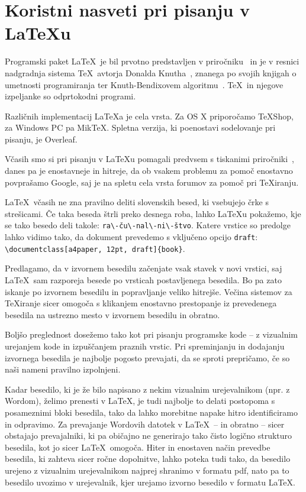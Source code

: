 \documentclass[a4paper,12pt,openright]{book}
\begin{document}
\chapter{Koristni nasveti pri pisanju v \LaTeX{u}}
\label{latex}

Programski paket \LaTeX\ je bil prvotno predstavljen v priročniku~\cite{lamport} in je v resnici nadgradnja sistema \TeX\ avtorja Donalda Knutha~\cite{knuth}, 
znanega po svojih knjigah o umetnosti programiranja
ter Knuth-Bendixovem algoritmu~\cite{knuth1983simple}.
\TeX\ in njegove izpeljanke so odprtokodni programi.

Različnih implementacij \LaTeX{}a je cela vrsta.
Za OS X priporočamo TeXShop, za Windows PC pa MikTeX.
Spletna verzija, ki poenostavi sodelovanje pri pisanju, je Overleaf.

Včasih smo si pri pisanju v \LaTeX{}u  pomagali predvsem s tiskanimi pri\-ro\-čni\-ki~\cite{lamport}, danes pa je enostavneje in hitreje, da ob vsakem problemu za pomoč enostavno povprašamo Google, 
saj je na spletu cela vrsta forumov za pomoč pri \TeX iranju.

\LaTeX\ včasih ne zna pravilno deliti slovenskih besed, ki vsebujejo črke s streši\-ca\-mi. 
Če taka beseda štrli preko desnega roba,  lahko \LaTeX{}u pokažemo, kje se tako besedo deli takole: \verb=ra\-ču\-nal\-ni\-štvo=.
Katere vrstice so predolge lahko vidimo tako, da dokument prevedemo s vključeno opcijo \texttt{draft}: \verb=\documentclass[a4paper, 12pt, draft]{book}=.

Predlagamo, da v izvornem besedilu začenjate vsak stavek v novi vrstici, saj \LaTeX\ sam razporeja besede po vrsticah postavljenega besedila. 
Bo pa zato iskanje po izvornem besedilu in popravljanje veliko hitrejše. 
Večina sistemov za \TeX{}iranje sicer omogoča s klikanjem enostavno prestopanje  iz prevedenega besedila na ustrezno mesto v izvornem besedilu in obratno.

Boljšo preglednost dosežemo tako kot pri pisanju programske kode -- z vizualnim urejanjem kode in izpuščanjem praznih vrstic.
Pri spreminjanju in dodajanju izvornega besedila je najbolje pogosto prevajati, da se sproti prepričamo, če so naši nameni pravilno izpolnjeni.

Kadar besedilo, ki je že bilo napisano z nekim vizualnim urejevalnikom (npr. z Wordom), želimo prenesti v \LaTeX, je tudi najbolje to delati postopoma s posameznimi bloki besedila, 
tako da lahko morebitne napake hitro identificiramo in odpravimo.
Za prevajanje Wordovih datotek v \LaTeX\ -- in obratno -- sicer obstajajo prevajalniki, ki pa običajno ne generirajo tako čisto logično strukturo besedila, kot jo sicer \LaTeX\ omogoča.
Hiter in enostaven način prevedbe besedila, ki  zahteva sicer ročne dopolnitve, lahko poteka tudi tako, da besedilo urejeno z vizualnim urejevalnikom najprej shranimo v formatu pdf, 
nato pa to besedilo uvozimo v urejevalnik, kjer urejamo izvorno besedilo v formatu \LaTeX.
\end{document}
